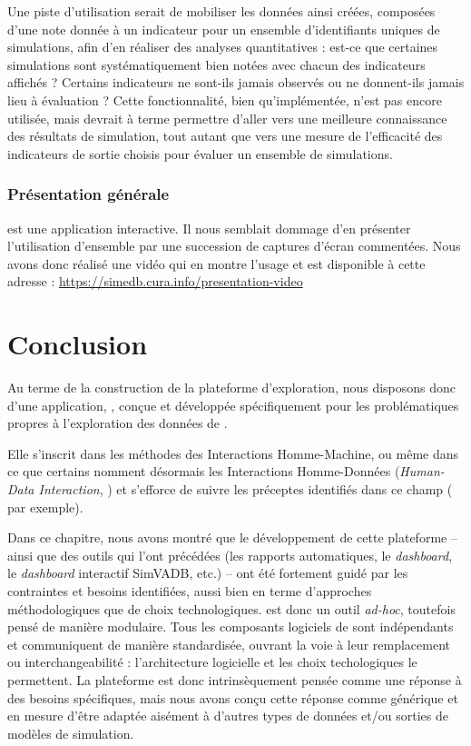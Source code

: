 Une piste d'utilisation serait de mobiliser les données ainsi créées, composées d'une note donnée à un indicateur pour un ensemble d'identifiants uniques de simulations, afin d'en réaliser des analyses quantitatives : est-ce que certaines simulations sont systématiquement bien notées avec chacun des indicateurs affichés ? Certains indicateurs ne sont-ils jamais observés ou ne donnent-ils jamais lieu à évaluation ?
Cette fonctionnalité, bien qu'implémentée, n'est pas encore utilisée, mais devrait à terme permettre d'aller vers une meilleure connaissance des résultats de simulation, tout autant que vers une mesure de l'efficacité des indicateurs de sortie choisis pour évaluer un ensemble de simulations.

\subsubsection{Présentation générale}

\simedb{} est une application interactive.
Il nous semblait dommage d'en présenter l'utilisation d'ensemble par une succession de captures d'écran commentées.
Nous avons donc réalisé une vidéo qui en montre l'usage et est disponible à cette adresse : \href{https://simedb.cura.info/presentation-video}{https://simedb.cura.info/presentation-video}


\section*{Conclusion}

Au terme de la construction de la plateforme d'exploration, nous disposons donc d'une application, \simedb{}, conçue et développée spécifiquement pour les problématiques propres à l'exploration des données de \simfeodal{}.

Elle s'inscrit dans les méthodes des Interactions Homme-Machine, ou même dans ce que certains nomment désormais les \og Interactions Homme-Données\fg{} (\og \textit{Human-Data Interaction}\fg{}, \cite{elmqvist_embodied_2011,mortier_human-data_2014}) et s'efforce de suivre les préceptes identifiés dans ce champ (\cite[167-170]{amirpour_amraii_human-data_2018} par exemple).

Dans ce chapitre, nous avons montré que le développement de cette plateforme -- ainsi que des outils qui l'ont précédées (les rapports automatiques, le \textit{dashboard}, le \textit{dashboard} interactif SimVADB, etc.) -- ont été fortement guidé par les contraintes et besoins identifiées, aussi bien en terme d'approches méthodologiques que de choix technologiques.
\simedb{} est donc un outil \textit{ad-hoc}, toutefois pensé de manière modulaire.
Tous les composants logiciels de \simedb{} sont indépendants et communiquent de manière standardisée, ouvrant la voie à leur remplacement ou \og interchangeabilité\fg{} : l'architecture logicielle et les choix techologiques le permettent.
La plateforme \simedb{} est donc intrinsèquement pensée comme une réponse à des besoins spécifiques, mais nous avons conçu cette réponse comme générique et en mesure d'être adaptée aisément à d'autres types de données et/ou sorties de modèles de simulation.

